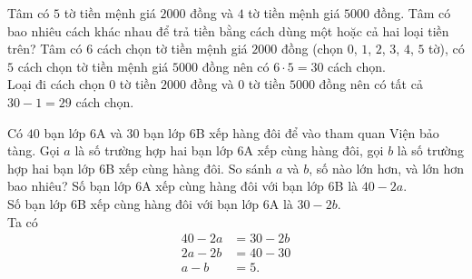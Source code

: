 \begin{bt}
	Tâm có $5$ tờ tiền mệnh giá $2000$ đồng và $4$ tờ tiền mệnh giá $5000$ đồng. Tâm có bao nhiêu cách khác nhau để trả tiền bằng cách dùng một hoặc cả hai loại tiền trên?
	\loigiai
	{
		Tâm có $6$ cách chọn tờ tiền mệnh giá $2000$ đồng (chọn $0$, $1$, $2$, $3$, $4$, $5$ tờ), có $5$ cách chọn tờ tiền mệnh giá $5000$ đồng nên có $6 \cdot 5 = 30$ cách chọn.\\
		Loại đi cách chọn $0$ tờ tiền $2000$ đồng và $0$ tờ tiền $5000$ đồng nên có tất cả $30-1=29$ cách chọn.
	}
\end{bt}

\begin{bt}
	Có $40$ bạn lớp $6$A và $30$ bạn lớp $6$B xếp hàng đôi để vào tham quan Viện bảo tàng. Gọi $a$ là số trường hợp hai bạn lớp $6$A xếp cùng hàng đôi, gọi $b$ là số trường hợp hai bạn lớp $6$B xếp cùng hàng đôi. So sánh $a$ và $b$, số nào lớn hơn, và lớn hơn bao nhiêu?
	\loigiai
	{
		Số bạn lớp $6$A xếp cùng hàng đôi với bạn lớp $6$B là $40-2a$.\\
		Số bạn lớp $6$B xếp cùng hàng đôi với bạn lớp $6$A là $30-2b$.\\
		Ta có 
		\begin{align*}
			40-2a &= 30-2b\\
			2a-2b &= 40-30\\
			a-b &= 5.
		\end{align*}
	}
\end{bt}

